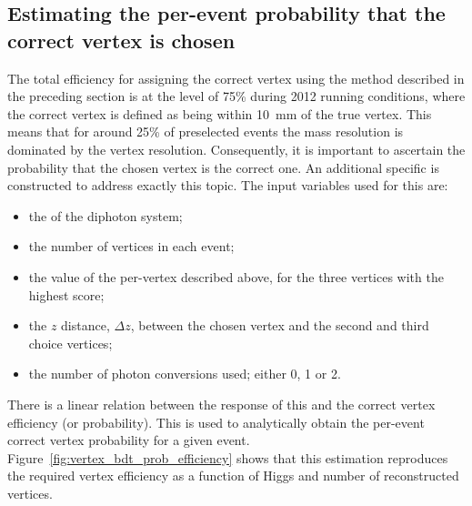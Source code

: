 \subsection{Estimating the per-event probability that the correct vertex is chosen}
\label{sec:bdt_prob}

The total efficiency for assigning the correct vertex using the method described in the preceding section is at the level of 75\% during 2012 running conditions, where the correct vertex is defined as being within 10~mm of the true vertex. This means that for around 25\% of preselected events the mass resolution is dominated by the vertex resolution. Consequently, it is important to ascertain the probability that the chosen vertex is the correct one. An additional specific \BDT is constructed to address exactly this topic. The input variables used for this \BDT are:

\begin{itemize}
  \item the \pT of the diphoton system;
  \item the number of vertices in each event;
  \item the value of the per-vertex \BDT described above, for the three vertices with the highest score;
  \item the $z$ distance, $\Delta z$, between the chosen vertex and the second and third choice vertices;
  \item the number of photon conversions used; either 0, 1 or 2.
\end{itemize}

There is a linear relation between the response of this \BDT and the correct vertex efficiency (or probability). This is used to analytically obtain the per-event correct vertex probability for a given event. Figure~\ref{fig:vertex_bdt_prob_efficiency} shows that this estimation reproduces the required vertex efficiency as a function of Higgs \pT and number of reconstructed vertices.

